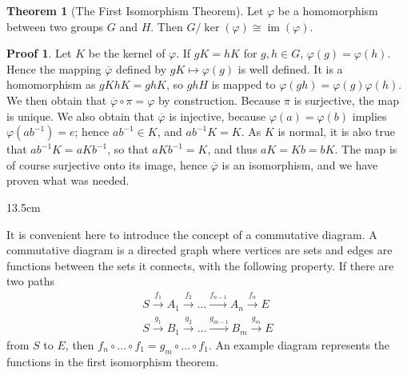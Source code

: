 \documentclass[12pt]{amsbook}
\theoremstyle{definition}
\newtheorem{theorem}{Theorem}[chapter]
\newtheorem*{prf}{Proof}
\newcommand{\im}{\operatorname{im}} %
\begin{document}
\begin{theorem}[The First Isomorphism Theorem] 
Let $\varphi$ be a homomorphism between two groups $G$ and $H$. Then $G/\ker(\varphi) \cong \im(\varphi)$.
\end{theorem}
\begin{prf}
    Let $K$ be the kernel of $\varphi$. If $gK = hK$ for $g,h \in G$, $\varphi(g) = \varphi(h)$. Hence the mapping $\overline{\varphi}$ defined by $gK \mapsto \varphi(g)$ is well defined. It is a homomorphism as $gKhK = ghK$, so $ghH$ is mapped to $\varphi(gh) = \varphi(g)\varphi(h)$. We then obtain that $\overline{\varphi} \circ \pi = \varphi$ by construction. Because $\pi$ is surjective, the map is unique. We also obtain that $\overline{\varphi}$ is injective, because $\varphi(a) = \varphi(b)$ implies $\varphi(ab^{-1}) = e$; hence $ab^{-1} \in K$, and $ab^{-1}K = K$. As $K$ is normal, it is also true that $ab^{-1}K = aKb^{-1}$, so that $aKb^{-1} = K$, and thus $aK = Kb = bK$. The map is of course surjective onto its image, hence $\overline{\varphi}$ is an isomorphism, and we have proven what was needed.
\end{prf}

\begin{wrapfigure}{1}{3.5cm}
\end{wrapfigure}

It is convenient here to introduce the concept of a commutative diagram. A commutative diagram is a directed graph where vertices are sets and edges are functions between the sets it connects, with the following property. If there are two paths
%
\begin{align*}
    S \xrightarrow{f_1} A_1 \xrightarrow{f_2} \dots \xrightarrow{f_{n-1}} A_n \xrightarrow{f_n} E\\
    S \xrightarrow{g_1} B_1 \xrightarrow{g_2} \dots \xrightarrow{g_{m-1}} B_m \xrightarrow{g_m} E
\end{align*}
%
from $S$ to $E$, then $f_n \circ \dots \circ f_1 = g_m \circ \dots \circ f_1$. An example diagram represents the functions in the first isomorphism theorem.
\end{document}
